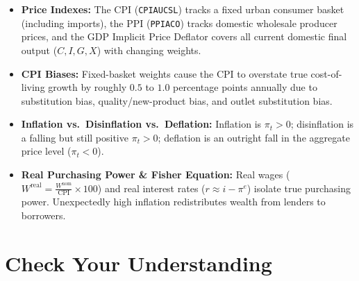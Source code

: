 \documentclass[11pt,letterpaper]{article}
\begin{document}
\begin{takeaways}
\begin{itemize}
    \item \textbf{Price Indexes:} The CPI (\texttt{CPIAUCSL}) tracks a fixed urban consumer basket (including imports), the PPI (\texttt{PPIACO}) tracks domestic wholesale producer prices, and the GDP Implicit Price Deflator covers all current domestic final output ($C, I, G, X$) with changing weights.
    \item \textbf{CPI Biases:} Fixed-basket weights cause the CPI to overstate true cost-of-living growth by roughly $0.5$ to $1.0$ percentage points annually due to substitution bias, quality/new-product bias, and outlet substitution bias.
    \item \textbf{Inflation vs.\ Disinflation vs.\ Deflation:} Inflation is $\pi_t > 0$; disinflation is a falling but still positive $\pi_t > 0$; deflation is an outright fall in the aggregate price level ($\pi_t < 0$).
    \item \textbf{Real Purchasing Power \& Fisher Equation:} Real wages ($W^{\text{real}} = \frac{W^{\text{nom}}}{\text{CPI}} \times 100$) and real interest rates ($r \approx i - \pi^e$) isolate true purchasing power. Unexpectedly high inflation redistributes wealth from lenders to borrowers.
\end{itemize}
\end{takeaways}

\section*{Check Your Understanding}
\end{document}
